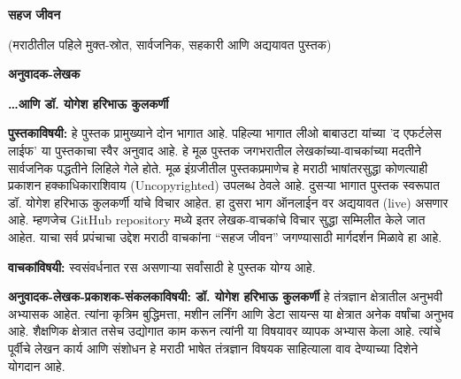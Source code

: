 \documentclass{article}
\begin{document}
\thispagestyle{empty}
\null\vfill

\begin{center}
{\fontsize{64}{78}\selectfont\color{titleorange}\textbf{सहज जीवन}}

\vspace{1em}

{\fontsize{10}{14}\selectfont\color{subtitleblue}(मराठीतील पहिले मुक्त-स्रोत, सार्वजनिक, सहकारी आणि अद्ययावत पुस्तक)}

\vspace{10em}

{\fontsize{12}{14}\selectfont\color{authorgreen}\textbf{अनुवादक-लेखक}}

\vspace{1em}

{\fontsize{18}{20}\selectfont\color{authorgreen}\textbf{\ldots आणि  डॉ. योगेश हरिभाऊ कुलकर्णी}}
\end{center}

\vfill\null
\clearpage

\thispagestyle{empty}
\vspace*{0.5in}

\noindent\textbf{पुस्तकाविषयी:} हे पुस्तक प्रामुख्याने दोन भागात आहे.  पहिल्या भागात लीओ बाबाउटा यांच्या 'द एफर्टलेस लाईफ' या पुस्तकाचा स्वैर अनुवाद आहे.  हे मूळ पुस्तक जगभरातील लेखकांच्या-वाचकांच्या मदतीने सार्वजनिक पद्धतीने लिहिले गेले होते.  मूळ इंग्रजीतील पुस्तकप्रमाणेच  हे मराठी भाषांतरसुद्धा  कोणत्याही प्रकाशन हक्काधिकाराशिवाय (Uncopyrighted) उपलब्ध ठेवले आहे.  दुसऱ्या भागात पुस्तक स्वरूपात डॉ. योगेश हरिभाऊ कुलकर्णी यांचे विचार आहेत.  हा दुसरा भाग ऑनलाईन वर अद्ययावत (live) असणार आहे.  म्हणजेच GitHub repository मध्ये इतर लेखक-वाचकांचे विचार सुद्धा सम्मिलीत केले जात आहेत. याचा सर्व प्रपंचाचा उद्देश मराठी वाचकांना ``सहज जीवन'' जगण्यासाठी मार्गदर्शन मिळावे हा आहे. 

\vspace{1.5em}

\noindent\textbf{वाचकांविषयी:} स्वसंवर्धनात रस असणाऱ्या सर्वांसाठी हे पुस्तक योग्य आहे.

\vspace{1.5em}

\noindent\textbf{अनुवादक-लेखक-प्रकाशक-संकलकाविषयी: डॉ. योगेश हरिभाऊ कुलकर्णी} हे तंत्रज्ञान क्षेत्रातील अनुभवी अभ्यासक आहेत. त्यांना कृत्रिम बुद्धिमत्ता, मशीन लर्निंग आणि डेटा सायन्स या क्षेत्रात अनेक वर्षांचा अनुभव आहे. शैक्षणिक क्षेत्रात तसेच उद्योगात काम करून त्यांनी या विषयावर व्यापक अभ्यास केला आहे. त्यांचे पूर्वीचे लेखन कार्य आणि संशोधन हे मराठी भाषेत तंत्रज्ञान विषयक साहित्याला वाव देण्याच्या दिशेने योगदान आहे.
\end{document}
